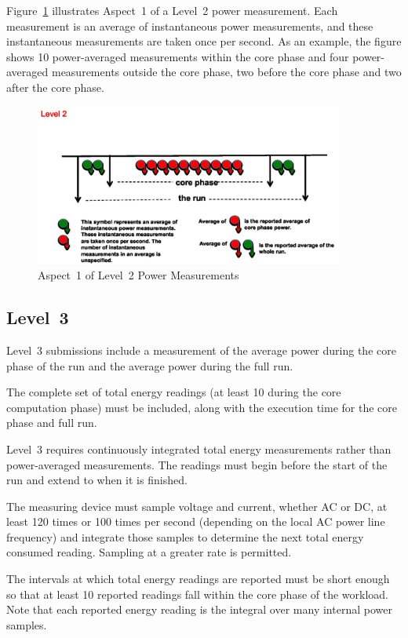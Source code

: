 \noindent
Figure~\ref{fig:a1l2pm} illustrates Aspect~1 of a Level~2 power measurement.
Each measurement is an average of instantaneous power measurements, and these instantaneous measurements are taken once per second.
As an example, the figure shows 10 power-averaged measurements within the core phase and four power-averaged measurements outside the core phase, two before the core phase and two after the core phase.

\begin{figure}
\centering
\includegraphics[width=4in]{fig3-4}
\caption{Aspect~1 of Level~2 Power Measurements}
\label{fig:a1l2pm}
\end{figure}

\subsection{Level~3}
\noindent
Level~3 submissions include a measurement of the average power during the core phase of the run and the average power during the full run.
\wl

\noindent
The complete set of total energy readings (at least 10 during the core computation phase) must be included, along with the execution time for the core phase and full run.
\wl

\noindent
Level~3 requires continuously integrated total energy measurements rather than power-averaged measurements.
The readings must begin before the start of the run and extend to when it is finished.
\wl

\noindent
The measuring device must sample voltage and current, whether AC or DC, at least 120 times or 100 times per second (depending on the local AC power line frequency) and integrate those samples to determine the next total energy consumed reading.
Sampling at a greater rate is permitted.
\wl

\noindent
The intervals at which total energy readings are reported must be short enough so that at least 10 reported readings fall within the core phase of the workload.
Note that each reported energy reading is the integral over many internal power samples.
\wl


